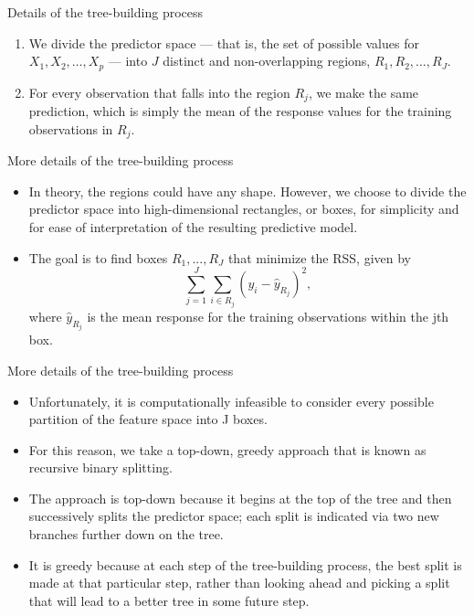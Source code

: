 \documentclass[aspectratio=169, 11pt]{beamer}
\begin{document}
\begin{frame}{Details of the tree-building process}
\begin{enumerate}
    \item We divide the predictor space --- that is, the set of possible values for $X_1, X_2, \dots, X_p$ --- into $J$ distinct and non-overlapping regions, $R_{1},R_{2},...,R_{J}$.
    \item For every observation that falls into the region $R_{j}$, we make the same prediction, which is simply the mean of the response values for the training observations in $R_{j}$.
\end{enumerate}
\end{frame}

\begin{frame}{More details of the tree-building process}
\begin{itemize}
    \item In theory, the regions could have any shape. However, we choose to divide the predictor space into high-dimensional rectangles, or boxes, for simplicity and for ease of interpretation of the resulting predictive model.
    \item The goal is to find boxes $R_{1},...,R_{J}$ that minimize the RSS, given by
    \begin{equation*}
    \sum_{j=1}^{J}\sum_{i\in R_{j}}(y_{i}-\hat{y}_{R_{j}})^{2},
    \end{equation*}
    where $\hat{y}_{R_{j}}$ is the mean response for the training observations within the jth box.
\end{itemize}
\end{frame}

\begin{frame}{More details of the tree-building process}
\begin{itemize}
    \item Unfortunately, it is computationally infeasible to consider every possible partition of the feature space into J boxes.
    \item For this reason, we take a top-down, greedy approach that is known as recursive binary splitting.
    \item The approach is top-down because it begins at the top of the tree and then successively splits the predictor space; each split is indicated via two new branches further down on the tree.
    \item It is greedy because at each step of the tree-building process, the best split is made at that particular step, rather than looking ahead and picking a split that will lead to a better tree in some future step.
\end{itemize}
\end{frame}
\end{document}
